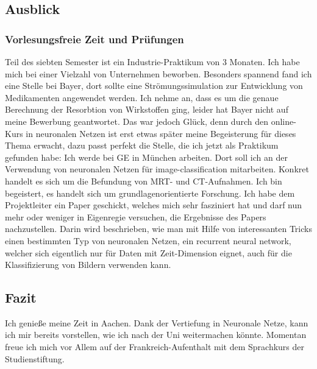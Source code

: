 \documentclass[12pt]{article}
\begin{document}
\begin{large}
\pagebreak
\subsection*{Ausblick}
\subsubsection*{Vorlesungsfreie Zeit und Prüfungen}
Teil des siebten Semester ist ein Industrie-Praktikum von 3 Monaten. Ich habe mich bei einer Vielzahl von Unternehmen beworben. Besonders spannend fand ich eine Stelle bei Bayer, dort sollte eine Strömungssimulation zur Entwicklung von Medikamenten angewendet werden. Ich nehme an, dass es um die genaue Berechnung der Resorbtion von Wirkstoffen ging, leider hat Bayer nicht auf meine Bewerbung geantwortet. Das war jedoch Glück, denn durch den online-Kurs in neuronalen Netzen ist erst etwas später meine Begeisterung für dieses Thema erwacht, dazu passt perfekt die Stelle, die ich jetzt als Praktikum gefunden habe: Ich werde bei GE in München arbeiten. Dort soll ich an der Verwendung von neuronalen Netzen für image-classification mitarbeiten. Konkret handelt es sich um die Befundung von MRT- und CT-Aufnahmen. Ich bin begeistert, es handelt sich um grundlagenorientierte Forschung. Ich habe dem Projektleiter ein Paper geschickt, welches mich sehr fasziniert hat und darf nun mehr oder weniger in Eigenregie versuchen, die Ergebnisse des Papers nachzustellen. Darin wird beschrieben, wie man mit Hilfe von interessanten Tricks einen bestimmten Typ von neuronalen Netzen, ein recurrent neural network, welcher sich eigentlich nur für Daten mit Zeit-Dimension eignet, auch für die Klassifizierung von Bildern verwenden kann.
\newline
\newline
\pagebreak
\subsection*{Fazit}
Ich genieße meine Zeit in Aachen. Dank der Vertiefung in Neuronale Netze, kann ich mir bereits vorstellen, wie ich nach der Uni weitermachen könnte.
Momentan freue ich mich vor Allem auf der Frankreich-Aufenthalt mit dem Sprachkurs der Studienstiftung.
\newline
\newline


\end{large}
\end{document}
